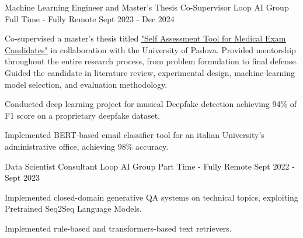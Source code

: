 \begin{cventries}
    
    \cventry
    {Machine Learning Engineer and Master's Thesis Co-Supervisor} %
    {Loop AI Group} %
    {Full Time - Fully Remote} %
    {Sept 2023 - Dec 2024} %
    {
      \begin{cvitems} %
        \item {
        Co-supervised a master's thesis titled \href{https://thesis.unipd.it/handle/20.500.12608/70905}{\underline{"Self Assessment Tool for Medical Exam Candidates"}} in collaboration with the University of Padova.
Provided mentorship throughout the entire research process, from problem formulation to final defense.
Guided the candidate in literature review, experimental design, machine learning model selection, and evaluation methodology.
        }
        \item {Conducted deep learning project for musical Deepfake detection achieving 94\% of F1 score on a proprietary deepfake dataset.}
        \item {Implemented BERT-based email classifier tool for an italian University's administrative office, achieving 98\% accuracy.}
      \end{cvitems}
    }

    
    \cventry
    {Data Scientist Consultant} %
    {Loop AI Group} %
    {Part Time - Fully Remote} %
    {Sept 2022 - Sept 2023} %
    {
      \begin{cvitems} %
        \item {Implemented closed-domain generative QA systems on technical topics, exploiting Pretrained Seq2Seq Language Models.}
        \item {Implemented rule-based and transformers-based text retrievers.}
      \end{cvitems}
    } 
    \begin{comment}
    \cventry
    {Bartender} %
    {Chiosco il Tempio} %
    {Part Time - Florence, Italy} %
    {June 2017 - Sept 2022} %
    {
        \begin{cvitems} %
        \item {Managed inventory and organized events, improving customer engagement and operational efficiency.}
        \item {Led team scheduling and ensured high standards of service and compliance with safety regulations.}
        \item {\textbf{Soft Skills:} Public Relations Management, Communication, Time Management, Multitasking.}
    \end{cvitems}
    }
    \end{comment}


\end{cventries}
